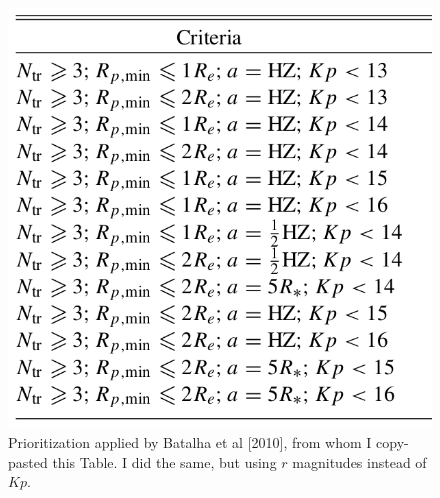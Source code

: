 \documentclass{emulateapj}
\begin{document}
\begin{figure}
	\begin{center}
		\includegraphics[scale=0.3]{figures/batalha_2010_table_1.png}
	\end{center}
	\caption{Prioritization applied by Batalha et al [2010], from whom I 
	copy-pasted this Table. I did the same, but using $r$ magnitudes instead of 
	$Kp$.}
	\label{fig:batalha_table_1}
\end{figure}
\end{document}
